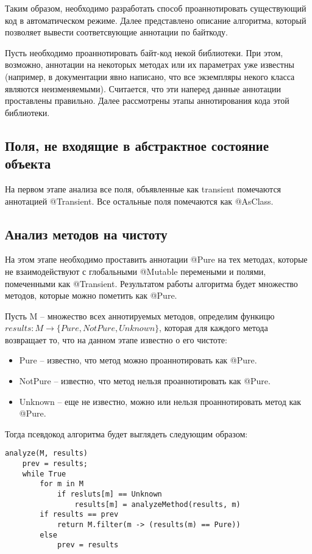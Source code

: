 Таким образом, необходимо разработать способ проаннотировать существующий код в автоматическом режиме. Далее представлено описание алгоритма, который позволяет вывести соответсвующие аннотации по байткоду. 

Пусть необходимо проаннотировать байт-код некой библиотеки. При этом, возможно, аннотации на некоторых методах или их параметрах уже известны (например, в документации явно написано, что все экземпляры некого класса являются неизменяемыми). Считается, что эти наперед данные аннотации проставлены правильно. Далее рассмотрены этапы аннотирования кода этой библиотеки.

\subsection{Поля, не входящие в абстрактное состояние объекта}

На первом этапе анализа все поля, объявленные как transient помечаются аннотацией @Transient. Все остальные поля помечаются как @AsClass. 

\subsection{Анализ методов на чистоту}

На этом этапе необходимо проставить аннотации @Pure на тех методах, которые не взаимодействуют с глобальными @Mutable перемеными и полями, помеченными как @Transient. Результатом работы алгоритма будет множество методов, которые можно пометить как @Pure. 

Пусть M -- множество всех аннотируемых методов, определим функицю $results: M \rightarrow \{Pure, NotPure, Unknown\}$, которая для каждого метода возвращает то, что на данном этапе известно о его чистоте:
\begin{itemize}
\item Pure -- известно, что метод можно проаннотировать как @Pure.
\item NotPure -- известно, что метод нельзя проаннотировать как @Pure.
\item Unknown -- еще не известно, можно или нельзя проаннотировать метод как @Pure.
\end{itemize}

Тогда псевдокод алгоритма будет выглядеть следующим образом:

\begin{lstlisting}[caption=Анализ чистоты методов, label=code:purity]
analyze(M, results)
    prev = results;
    while True 
        for m in M 
            if resluts[m] == Unknown
                results[m] = analyzeMethod(results, m)
        if results == prev 
        	return M.filter(m -> (results(m) == Pure))        
        else 
            prev = results
\end{lstlisting}

